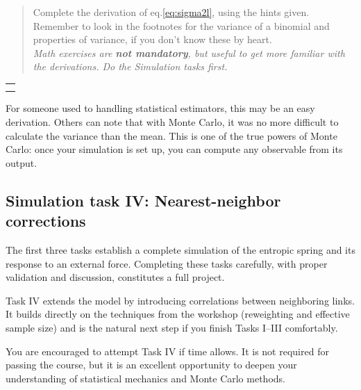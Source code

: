 \documentclass[11pt]{article}
\newcommand{\exercise}[1]{\par \vspace{0.5cm} \noindent  {\large \colorbox{mygrey}{\begin{minipage}{\textwidth}{\textbf{Math exercise}}\end{minipage}}} \par \noindent \begin{quote} 
\small{#1} \\
\footnotesize{\textit{Math exercises are \textbf{not mandatory}, but useful to get more familiar with the derivations. Do the Simulation tasks first.}}
\end{quote} 
\begin{tabular}{c} \\ \toprule \\ \hspace{15cm} \\ \end{tabular}}
\begin{document}
\exercise{
  Complete the derivation of eq.\eqref{eq:sigma2l}, using the hints given. Remember to look in the footnotes for the variance of a binomial and properties of variance, if you don't know these by heart.
}

For someone used to handling statistical estimators, this may be an easy derivation.
Others can note that with Monte Carlo, it was no more difficult to calculate the variance than the mean.
This is one of the true powers of Monte Carlo: once your simulation is set up, you can compute any observable from its output.

\subsection*{Simulation task IV: Nearest-neighbor corrections}
The first three tasks establish a complete simulation of the entropic spring and its response to an external force.
Completing these tasks carefully, with proper validation and discussion, constitutes a full project.

Task IV extends the model by introducing correlations between neighboring links. It builds directly on the techniques from the workshop (reweighting and effective sample size) and is the natural next step if you finish Tasks I–III comfortably.

You are encouraged to attempt Task IV if time allows. It is not required for passing the course, but it is an excellent opportunity to deepen your understanding of statistical mechanics and Monte Carlo methods.
\end{document}
